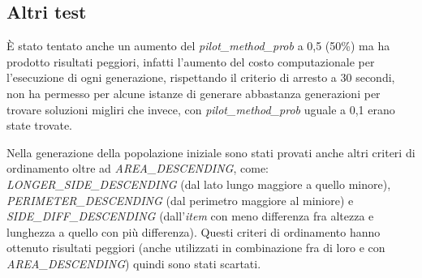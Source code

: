 \subsection{Altri test}

È stato tentato anche un aumento del \emph{pilot\_method\_prob} a 0,5 (50\%) ma ha prodotto risultati peggiori, infatti l'aumento del costo computazionale per l'esecuzione di ogni generazione, rispettando il criterio di arresto a 30 secondi, non ha permesso per alcune istanze di generare abbastanza generazioni per trovare soluzioni migliri che invece, con \emph{pilot\_method\_prob} uguale a 0,1 erano state trovate.

Nella generazione della popolazione iniziale sono stati provati anche altri criteri di ordinamento oltre ad \emph{AREA\_DESCENDING}, come: \emph{LONGER\_SIDE\_DESCENDING} (dal lato lungo maggiore a quello minore), \emph{PERIMETER\_DESCENDING} (dal perimetro maggiore al miniore) e \emph{SIDE\_DIFF\_DESCENDING} (dall'\emph{item} con meno differenza fra altezza e lunghezza a quello con più differenza). Questi criteri di ordinamento hanno ottenuto risultati peggiori (anche utilizzati in combinazione fra di loro e con \emph{AREA\_DESCENDING}) quindi sono stati scartati.